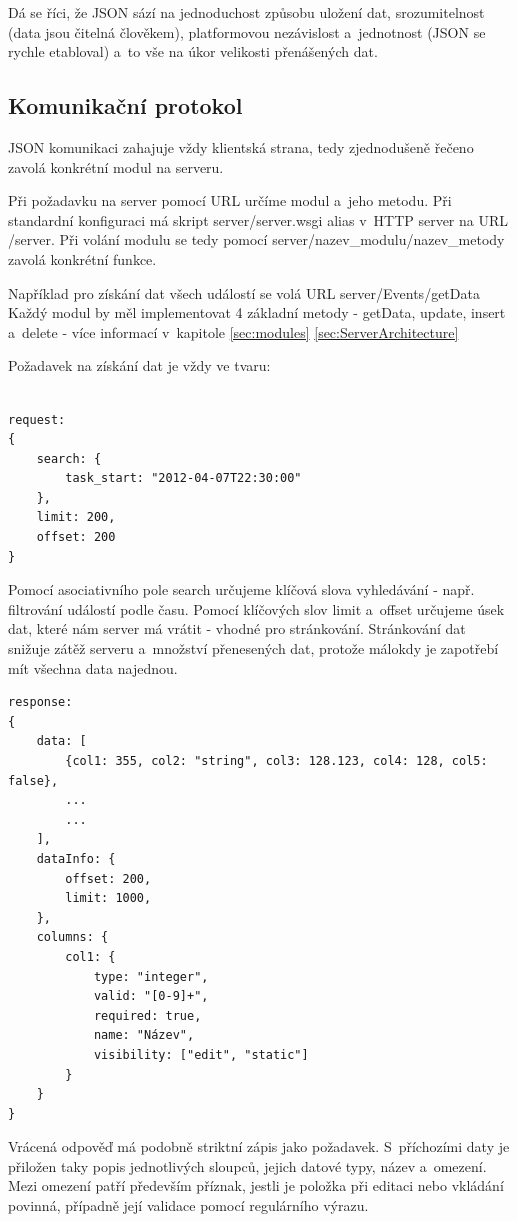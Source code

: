 \documentclass[bc,male,html,dept460]{diploma}				%
\begin{document}
Dá se říci, že JSON sází na jednoduchost způsobu uložení dat, srozumitelnost (data jsou čitelná člověkem),
platformovou nezávislost a~jednotnost (JSON se rychle etabloval) a~to vše na úkor velikosti přenášených dat.
\cite{javascript-json}

\newpage
\subsection{Komunikační protokol}
\label{sec:communication}
JSON komunikaci zahajuje vždy klientská strana, tedy zjednodušeně řečeno zavolá konkrétní modul na serveru.

Při požadavku na server pomocí URL určíme modul a~jeho metodu.
Při standardní konfiguraci má skript server/server.wsgi alias v~HTTP server na URL /server.
Při volání modulu se tedy pomocí server/nazev\_modulu/nazev\_metody zavolá konkrétní funkce.

Například pro získání dat všech událostí se volá URL server/Events/getData
Každý modul by měl implementovat 4 základní metody - getData, update, insert a~delete - více informací v~kapitole \ref{sec:modules}
\ref{sec:ServerArchitecture}

\bigskip
Požadavek na získání dat je vždy ve tvaru:
\begin{lstlisting}[label=src:Java,caption=Požadavek]

request:
{
	search: {
		task_start: "2012-04-07T22:30:00"
	},
	limit: 200,
	offset: 200
}
\end{lstlisting}

Pomocí asociativního pole search určujeme klíčová slova vyhledávání - např. filtrování událostí podle času.
Pomocí klíčových slov limit a~offset určujeme úsek dat, které nám server má vrátit - vhodné pro stránkování.
Stránkování dat snižuje zátěž serveru a~množství přenesených dat, protože málokdy je zapotřebí mít všechna data najednou.

\newpage
\begin{lstlisting}[label=src:JavaScript,caption=Odpověď]
response: 
{
	data: [
		{col1: 355, col2: "string", col3: 128.123, col4: 128, col5: false},
		...
		...
	],
	dataInfo: {
		offset: 200,
		limit: 1000,
	},
	columns: {
		col1: {
			type: "integer",
			valid: "[0-9]+",
			required: true,
			name: "Název",
			visibility: ["edit", "static"]
		}
	}
}
\end{lstlisting}

Vrácená odpověď má podobně striktní zápis jako požadavek. S~příchozími daty je přiložen taky popis jednotlivých sloupců,
jejich datové typy, název a~omezení. Mezi omezení patří především příznak, jestli je položka při editaci nebo vkládání povinná,
případně její validace pomocí regulárního výrazu.
\end{document}

